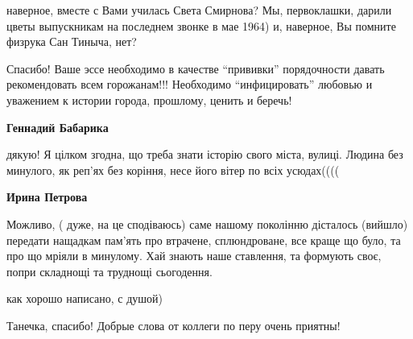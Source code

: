 \begin{itemize}
\begin{itemize}
наверное, вместе с Вами училась Света Смирнова? Мы, первоклашки, дарили цветы
выпускникам на последнем звонке в мае 1964) и, наверное, Вы помните физрука Сан
Тиныча, нет?

\end{itemize} %


Спасибо! Ваше эссе необходимо в качестве \enquote{прививки} порядочности давать
рекомендовать всем горожанам!!! Необходимо \enquote{инфицировать} любовью и уважением к
истории города, прошлому, ценить и беречь!

\begin{itemize} %
\textbf{Геннадий Бабарика} 

дякую! Я цілком згодна, що треба знати історію свого міста, вулиці. Людина без
минулого, як реп'ях без коріння, несе його вітер по всіх усюдах((((


\textbf{Ирина Петрова} 

Можливо, ( дуже, на це сподіваюсь) саме нашому поколінню дісталось (вийшло)
передати нащадкам пам'ять про втрачене, сплюндроване, все краще що було, та про
що мріяли в минулому. Хай знають наше ставлення, та формують своє, попри
складнощі та труднощі сьогодення.

\end{itemize} %

как хорошо написано, с душой)

Танечка, спасибо! Добрые слова от коллеги по перу очень приятны!

\end{itemize} %
